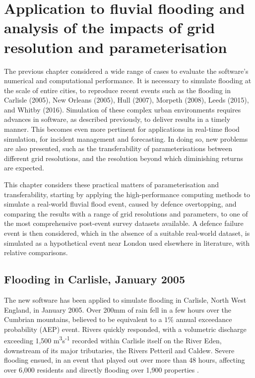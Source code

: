 \chapter{Application to fluvial flooding and analysis of the impacts of grid resolution and parameterisation}
\label{chapter:Fluvial}

The previous chapter considered a wide range of cases to evaluate the software's numerical and computational performance. It is necessary to simulate flooding at the scale of entire cities, to reproduce recent events such as the flooding in Carlisle (2005), New Orleans (2005), Hull (2007), Morpeth (2008), Leeds (2015), and Whitby (2016). Simulation of these complex urban environments requires advances in software, as described previously, to deliver results in a timely manner. This becomes even more pertinent for applications in real-time flood simulation, for incident management and forecasting. In doing so, new problems are also presented, such as the transferability of parameterisations between different grid resolutions, and the resolution beyond which diminishing returns are expected.

This chapter considers these practical matters of parameterisation and transferability, starting by applying the high-performance computing methods to simulate a real-world fluvial flood event, caused by defence overtopping, and comparing the results with a range of grid resolutions and parameters, to one of the most comprehensive post-event survey datasets available. A defence failure event is then considered, which in the absence of a suitable real-world dataset, is simulated as a hypothetical event near London used elsewhere in literature, with relative comparisons.

\section{Flooding in Carlisle, January 2005}

The new software has been applied to simulate flooding in Carlisle, North West England, in January 2005. Over 200mm of rain fell in a few hours over the Cumbrian mountains, believed to be equivalent to a \(1\%\) annual exceedance probability (AEP) event. Rivers quickly responded, with a volumetric discharge exceeding 1,500 m\textsuperscript{3}s\textsuperscript{-1} recorded within Carlisle itself on the River Eden, downstream of its major tributaries, the Rivers Petteril and Caldew. Severe flooding ensued, in an event that played out over more than 48 hours, affecting over 6,000 residents and directly flooding over 1,900 properties \citep{GONW2005,EnvironmentAgency2006a}.


